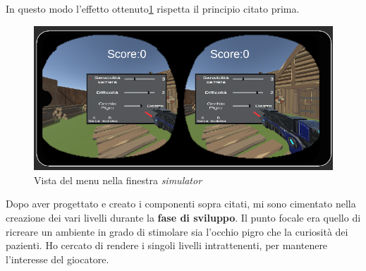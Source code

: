 \documentclass[10pt,a4paper]{article}
\begin{document}
    In questo modo l'effetto ottenuto\ref{fig:menu_simulator} rispetta il principio citato prima.
     \begin{figure}[H]
    	\centering
    	\includegraphics[width=0.8\linewidth]{image/menu_simulatore}
    	\caption{Vista del menu nella finestra \textit{simulator}}
    	\label{fig:menu_simulator}
    \end{figure}
    Dopo aver progettato e creato i componenti sopra citati, mi sono cimentato nella creazione dei vari livelli durante la \textbf{fase di sviluppo}. Il punto focale era quello di ricreare un ambiente in grado di stimolare sia l'occhio pigro che la curiosità dei pazienti. Ho cercato di rendere i singoli livelli intrattenenti, per mantenere l'interesse del giocatore.
\end{document}
